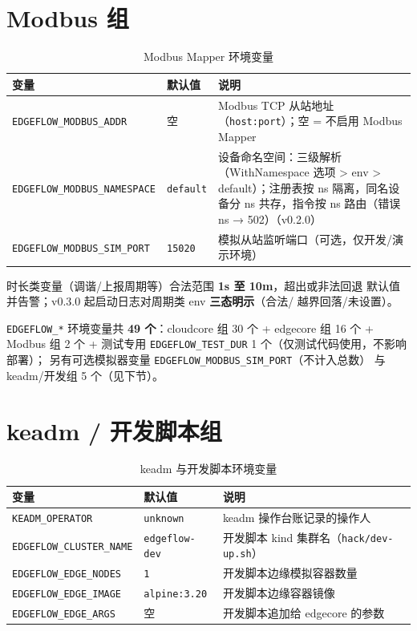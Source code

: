 \section{Modbus 组}

\begin{table}[htbp]
\centering
\caption{Modbus Mapper 环境变量}
\label{tab:a-modbus}
\begin{tabularx}{\textwidth}{l l X}
\toprule
\textbf{变量} & \textbf{默认值} & \textbf{说明} \\
\midrule
\texttt{EDGEFLOW\_MODBUS\_ADDR} & 空 & Modbus TCP 从站地址（\texttt{host:port}）；空 = 不启用 Modbus Mapper \\
\texttt{EDGEFLOW\_MODBUS\_NAMESPACE} & \texttt{default} & 设备命名空间：三级解析（WithNamespace 选项 > env > default）；注册表按 ns 隔离，同名设备分 ns 共存，指令按 ns 路由（错误 ns → 502）（v0.2.0） \\
\texttt{EDGEFLOW\_MODBUS\_SIM\_PORT} & \texttt{15020} & 模拟从站监听端口（可选，仅开发/演示环境） \\
\bottomrule
\end{tabularx}
\end{table}

时长类变量（调谐/上报周期等）合法范围 \textbf{1s 至 10m}，超出或非法回退
默认值并告警；v0.3.0 起启动日志对周期类 env \textbf{三态明示}（合法/
越界回落/未设置）。

\texttt{EDGEFLOW\_*} 环境变量共 \textbf{49 个}：cloudcore 组 30 个 +
edgecore 组 16 个 + Modbus 组 2 个 + 测试专用
\texttt{EDGEFLOW\_TEST\_DUR} 1 个（仅测试代码使用，不影响部署）；
另有可选模拟器变量 \texttt{EDGEFLOW\_MODBUS\_SIM\_PORT}（不计入总数）
与 keadm/开发组 5 个（见下节）。

\section{keadm / 开发脚本组}

\begin{table}[htbp]
\centering
\caption{keadm 与开发脚本环境变量}
\label{tab:a-keadm}
\begin{tabularx}{\textwidth}{l l X}
\toprule
\textbf{变量} & \textbf{默认值} & \textbf{说明} \\
\midrule
\texttt{KEADM\_OPERATOR} & \texttt{unknown} & keadm 操作台账记录的操作人 \\
\texttt{EDGEFLOW\_CLUSTER\_NAME} & \texttt{edgeflow-dev} & 开发脚本 kind 集群名（\texttt{hack/dev-up.sh}） \\
\texttt{EDGEFLOW\_EDGE\_NODES} & \texttt{1} & 开发脚本边缘模拟容器数量 \\
\texttt{EDGEFLOW\_EDGE\_IMAGE} & \texttt{alpine:3.20} & 开发脚本边缘容器镜像 \\
\texttt{EDGEFLOW\_EDGE\_ARGS} & 空 & 开发脚本追加给 edgecore 的参数 \\
\bottomrule
\end{tabularx}
\end{table}

